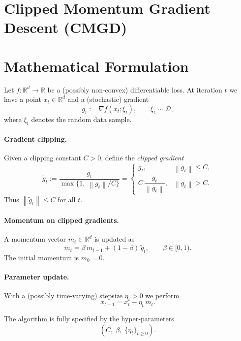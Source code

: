 \documentclass{article}
\newcommand{\norm}[1]{\left\lVert #1 \right\rVert}
\newcommand{\R}{\mathbb{R}}
\begin{document}
\section*{Clipped Momentum Gradient Descent (CMGD)}

\section*{Mathematical Formulation}
Let $f:\R^{d}\rightarrow\R$ be a (possibly non‑convex) differentiable loss.  
At iteration $t$ we have a point $x_t\in\R^{d}$ and a (stochastic) gradient 
\[
g_t:=\nabla f(x_t;\xi_t),\qquad \xi_t\sim\mathcal{D},
\]
where $\xi_t$ denotes the random data sample.  

\paragraph{Gradient clipping.}
Given a clipping constant $C>0$, define the \emph{clipped gradient}
\begin{equation}
\tilde g_t:=\frac{g_t}{\max\!\big\{1,\; \norm{g_t}/C\big\}}
          =\begin{cases}
            g_t, & \norm{g_t}\le C,\\[4pt]
            C\,\dfrac{g_t}{\norm{g_t}}, & \norm{g_t}>C .
          \end{cases}
\label{eq:clip}
\end{equation}
Thus $\norm{\tilde g_t}\le C$ for all $t$.

\paragraph{Momentum on clipped gradients.}
A momentum vector $m_t\in\R^{d}$ is updated as
\begin{equation}
m_t = \beta\, m_{t-1} + (1-\beta)\,\tilde g_t ,\qquad \beta\in[0,1).
\label{eq:momentum}
\end{equation}
The initial momentum is $m_{0}=0$.

\paragraph{Parameter update.}
With a (possibly time‑varying) stepsize $\eta_t>0$ we perform
\begin{equation}
x_{t+1}=x_t-\eta_t\, m_t .
\label{eq:update}
\end{equation}

The algorithm is fully specified by the hyper‑parameters 
\[
\boxed{(C,\;\beta,\;\{\eta_t\}_{t\ge 0}) } .
\]
\end{document}

